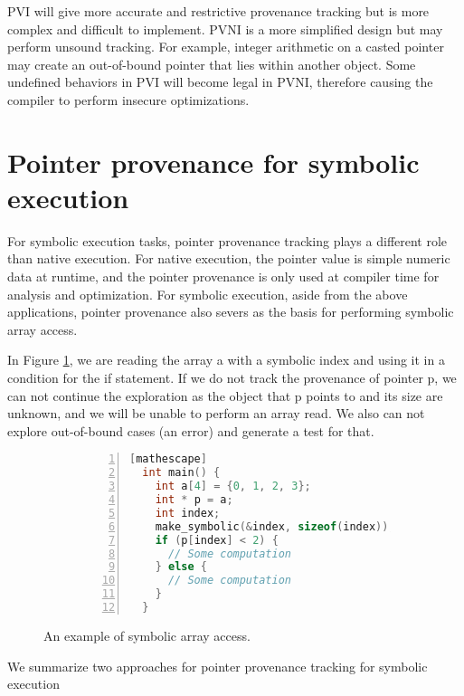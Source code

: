 \documentclass[sigplan, nonacm]{acmart}\settopmatter{printfolios=true,printccs=false,printacmref=false}
\newcommand{\tool}{\textsc{GenSym}\xspace}
\begin{document}
PVI will give more accurate and restrictive provenance tracking but is more complex and difficult to implement. PVNI is a more simplified design but may perform unsound tracking. For example, integer arithmetic on a casted pointer may create an out-of-bound pointer that lies within another object. Some undefined behaviors in PVI will become legal in PVNI, therefore causing the compiler to perform insecure optimizations.
\section{Pointer provenance for symbolic execution}\label{symbolicprovenance}
For symbolic execution tasks, pointer provenance tracking plays a different role than native execution. For native execution, the pointer value is simple numeric data at runtime, and the pointer provenance is only used at compiler time for analysis and optimization. For symbolic execution, aside from the above applications, pointer provenance also severs as the basis for performing symbolic array access.\par
In Figure \ref{fig:example}, we are reading the array a with a symbolic index and using it in a condition for the if statement. If we do not track the provenance of pointer p, we can not continue the exploration as the object that p points to and its size are unknown, and we will be unable to perform an array read. We also can not explore out-of-bound cases (an error) and generate a test for that.
\begin{figure}[t]
  \centering
  \begin{subfigure}{0.8\textwidth}
  \begin{lstlisting}[style=small,language=C,numbers=left,stepnumber=1,xleftmargin=2em,numberstyle=\ttfamily][mathescape]
  int main() {
    int a[4] = {0, 1, 2, 3};
    int * p = a;
    int index;
    make_symbolic(&index, sizeof(index));
    if (p[index] < 2) {
      // Some computation
    } else {
      // Some computation
    }
  }
  \end{lstlisting}
  \end{subfigure}
  \caption{An example of symbolic array access.}
  \label{fig:example}
  \end{figure}
  We summarize two approaches for pointer provenance tracking for symbolic execution
\end{document}

